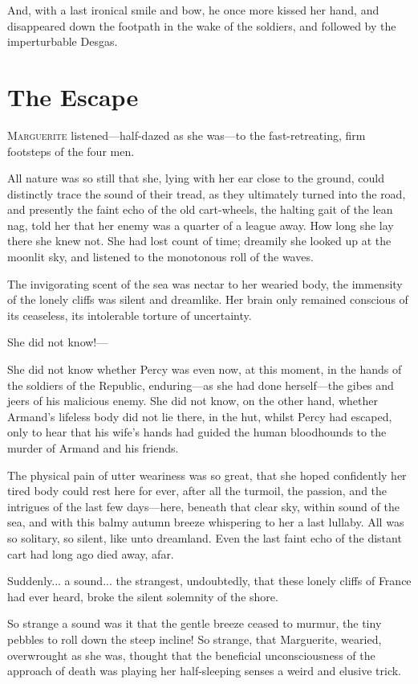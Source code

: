 \documentclass[paper=a5,BCOR=7mm,twoside,DIV=calc,12pt,usegeometry,chapterprefix,endperiod,headings=big]{scrbook}
\begin{document}
And, with a last ironical smile and bow, he once more kissed her hand, and disappeared down the footpath in the wake of the soldiers, and followed by the imperturbable Desgas.

\chapter{The Escape}
\lettrine[lines=4]{M}{arguerite} listened---half-dazed as she was---to the fast-retreating, firm footsteps of the four men.

All nature was so still that she, lying with her ear close to the ground, could distinctly trace the sound of their tread, as they ultimately turned into the road, and presently the faint echo of the old cart-wheels, the halting gait of the lean nag, told her that her enemy was a quarter of a league away. How long she lay there she knew not. She had lost count of time; dreamily she looked up at the moonlit sky, and listened to the monotonous roll of the waves.

The invigorating scent of the sea was nectar to her wearied body, the immensity of the lonely cliffs was silent and dreamlike. Her brain only remained conscious of its ceaseless, its intolerable torture of uncertainty.

She did not know!---

She did not know whether Percy was even now, at this moment, in the hands of the soldiers of the Republic, enduring---as she had done herself---the gibes and jeers of his malicious enemy. She did not know, on the other hand, whether Armand's lifeless body did not lie there, in the hut, whilst Percy had escaped, only to hear that his wife's hands had guided the human bloodhounds to the murder of Armand and his friends.

The physical pain of utter weariness was so great, that she hoped confidently her tired body could rest here for ever, after all the turmoil, the passion, and the intrigues of the last few days---here, beneath that clear sky, within sound of the sea, and with this balmy autumn breeze whispering to her a last lullaby. All was so solitary, so silent, like unto dreamland. Even the last faint echo of the distant cart had long ago died away, afar.

Suddenly... a sound... the strangest, undoubtedly, that these lonely cliffs of France had ever heard, broke the silent solemnity of the shore.

So strange a sound was it that the gentle breeze ceased to murmur, the tiny pebbles to roll down the steep incline! So strange, that Marguerite, wearied, overwrought as she was, thought that the beneficial unconsciousness of the approach of death was playing her half-sleeping senses a weird and elusive trick.
\end{document}

